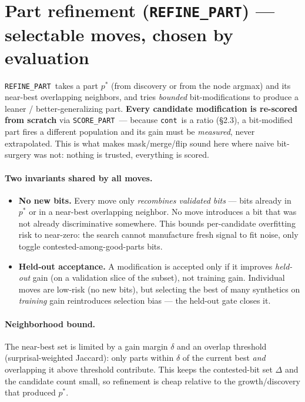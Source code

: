 \documentclass[11pt]{article}
\newcommand{\code}[1]{\texttt{#1}}
\newcommand{\cont}{\code{cont}}
\newcommand{\refine}{\code{REFINE\_PART}}
\newcommand{\score}{\code{SCORE\_PART}}
\begin{document}

\section{Part refinement (\texorpdfstring{\refine}{REFINE\_PART}) --- selectable moves, chosen by evaluation}

\refine\ takes a part $p^*$ (from discovery or from the node argmax) and its near-best overlapping neighbors, and tries \emph{bounded} bit-modifications to produce a leaner / better-generalizing part. \textbf{Every candidate modification is re-scored from scratch} via \score\ --- because \cont\ is a ratio (\S2.3), a bit-modified part fires a different population and its gain must be \emph{measured}, never extrapolated. This is what makes mask/merge/flip sound here where naive bit-surgery was not: nothing is trusted, everything is scored.

\paragraph{Two invariants shared by all moves.}
\begin{itemize}[nosep]
\item \textbf{No new bits.} Every move only \emph{recombines validated bits} --- bits already in $p^*$ or in a near-best overlapping neighbor. No move introduces a bit that was not already discriminative somewhere. This bounds per-candidate overfitting risk to near-zero: the search cannot manufacture fresh signal to fit noise, only toggle contested-among-good-parts bits.
\item \textbf{Held-out acceptance.} A modification is accepted only if it improves \emph{held-out} gain (on a validation slice of the subset), not training gain. Individual moves are low-risk (no new bits), but selecting the best of many synthetics on \emph{training} gain reintroduces selection bias --- the held-out gate closes it.
\end{itemize}

\paragraph{Neighborhood bound.} The near-best set is limited by a gain margin $\delta$ and an overlap threshold (surprisal-weighted Jaccard): only parts within $\delta$ of the current best \emph{and} overlapping it above threshold contribute. This keeps the contested-bit set $\Delta$ and the candidate count small, so refinement is cheap relative to the growth/discovery that produced $p^*$.
\end{document}
